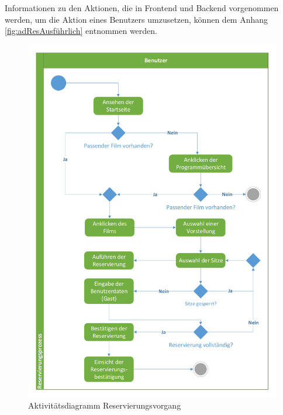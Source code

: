 				Informationen zu den Aktionen, die in Frontend und Backend vorgenommen werden, um die Aktion eines Benutzers umzusetzen, können dem Anhang \vref{fig:adResAusführlich} entnommen werden.
				
				\begin{figure}[H]
					\centering 
					\includegraphics[width=12cm]{img/adReservierung_min.pdf}
					\captionsetup{format=hang}
					\caption[Aktivitätsdiagramm Reservierung]{\label{fig:aktivitätReservierung} Aktivitätsdiagramm Reservierungsvorgang}
				\end{figure}
				
			